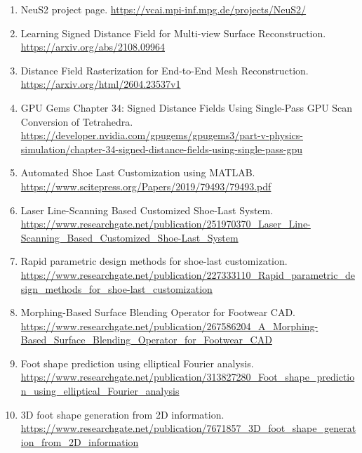\documentclass[
  10.5pt,
]{article}
\begin{document}
\begin{enumerate}
\item
  NeuS2 project page. \url{https://vcai.mpi-inf.mpg.de/projects/NeuS2/}
\item
  Learning Signed Distance Field for Multi-view Surface Reconstruction.
  \url{https://arxiv.org/abs/2108.09964}
\item
  Distance Field Rasterization for End-to-End Mesh Reconstruction.
  \url{https://arxiv.org/html/2604.23537v1}
\item
  GPU Gems Chapter 34: Signed Distance Fields Using Single-Pass GPU Scan
  Conversion of Tetrahedra.
  \url{https://developer.nvidia.com/gpugems/gpugems3/part-v-physics-simulation/chapter-34-signed-distance-fields-using-single-pass-gpu}
\item
  Automated Shoe Last Customization using MATLAB.
  \url{https://www.scitepress.org/Papers/2019/79493/79493.pdf}
\item
  Laser Line-Scanning Based Customized Shoe-Last System.
  \url{https://www.researchgate.net/publication/251970370_Laser_Line-Scanning_Based_Customized_Shoe-Last_System}
\item
  Rapid parametric design methods for shoe-last customization.
  \url{https://www.researchgate.net/publication/227333110_Rapid_parametric_design_methods_for_shoe-last_customization}
\item
  Morphing-Based Surface Blending Operator for Footwear CAD.
  \url{https://www.researchgate.net/publication/267586204_A_Morphing-Based_Surface_Blending_Operator_for_Footwear_CAD}
\item
  Foot shape prediction using elliptical Fourier analysis.
  \url{https://www.researchgate.net/publication/313827280_Foot_shape_prediction_using_elliptical_Fourier_analysis}
\item
  3D foot shape generation from 2D information.
  \url{https://www.researchgate.net/publication/7671857_3D_foot_shape_generation_from_2D_information}
\end{enumerate}
\end{document}
